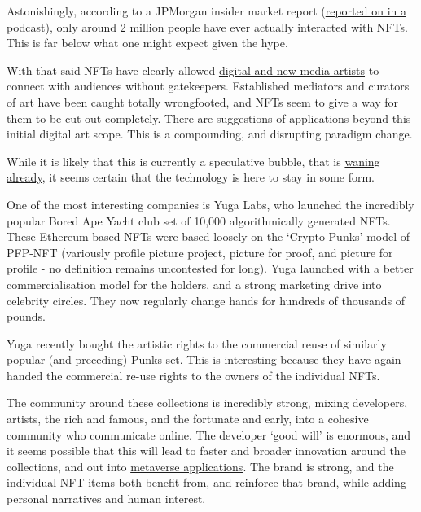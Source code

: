Astonishingly, according to a JPMorgan insider market report (\href{https://www.coindesk.com/podcasts/the-breakdown-with-nlw/jpmorgan-bitcoin-shows-some-merit-as-a-store-of-value/}{reported on in a podcast}), only around 2 million people have ever actually interacted with NFTs. This is far below what one might expect given the hype.\par
With that said NFTs have clearly allowed \href{https://en.wikipedia.org/wiki/List_of_most_expensive_non-fungible_tokens}{digital and new media artists} to connect with audiences without gatekeepers. Established mediators and curators of art have been caught totally wrongfooted, and NFTs seem to give a way for them to be cut out completely. There are suggestions of applications beyond this initial digital art scope. This is a compounding, and disrupting paradigm change.\par
While it is likely that this is currently a speculative bubble, that is \href{https://www.bbc.co.uk/news/business-61102759}{waning already}, it seems certain that the technology is here to stay in some form.\par
One of the most interesting companies is Yuga Labs, who launched the incredibly popular Bored Ape Yacht club set of 10,000 algorithmically generated NFTs. These Ethereum based NFTs were based loosely on the `Crypto Punks' model of PFP-NFT (variously profile picture project, picture for proof, and picture for profile - no definition remains uncontested for long). Yuga launched with a better commercialisation model for the holders, and a strong marketing drive into celebrity circles. They now regularly change hands for hundreds of thousands of pounds.\par
Yuga recently bought the artistic rights to the commercial reuse of similarly popular (and preceding) Punks set. This is interesting because they have again handed the commercial re-use rights to the owners of the individual NFTs. \par
The community around these collections is incredibly strong, mixing developers, artists, the rich and famous, and the fortunate and early, into a cohesive community who communicate online. The developer `good will' is enormous, and it seems possible that this will lead to faster and broader innovation around the collections, and out into \href{https://twitter.com/yugalabs/status/1505014986556551172?}{metaverse applications}. The brand is strong, and the individual NFT items both benefit from, and reinforce that brand, while adding personal narratives and human interest.\par 
